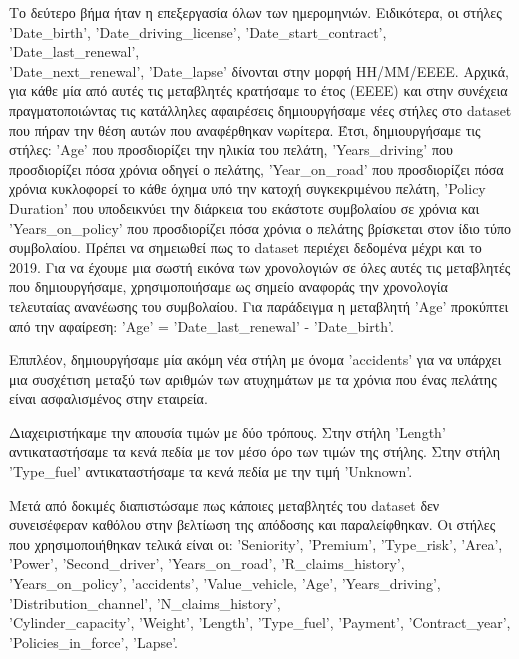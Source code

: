 \documentclass{llncs}
\begin{document}
Το δεύτερο βήμα ήταν η επεξεργασία όλων των ημερομηνιών. Ειδικότερα, οι στήλες 'Date\_birth', 'Date\_driving\_license', 'Date\_start\_contract', 'Date\_last\_renewal', \\
'Date\_next\_renewal', 'Date\_lapse' δίνονται στην μορφή ΗΗ/ΜΜ/ΕΕΕΕ. Αρχικά, για κάθε μία από αυτές τις μεταβλητές κρατήσαμε το έτος (ΕΕΕΕ) και στην συνέχεια πραγματοποιώντας τις κατάλληλες αφαιρέσεις
δημιουργήσαμε νέες στήλες στο dataset που πήραν την θέση αυτών που αναφέρθηκαν νωρίτερα. Έτσι, δημιουργήσαμε τις στήλες: 'Age' που προσδιορίζει την ηλικία του πελάτη, 'Years\_driving' που προσδιορίζει 
πόσα χρόνια οδηγεί ο πελάτης, 'Year\_on\_road' που προσδιορίζει πόσα χρόνια κυκλοφορεί το κάθε όχημα υπό την κατοχή συγκεκριμένου πελάτη, 'Policy Duration' που υποδεικνύει την διάρκεια του εκάστοτε συμβολαίου σε χρόνια και 
'Years\_on\_policy' που προσδιορίζει πόσα χρόνια ο πελάτης βρίσκεται στον ίδιο τύπο συμβολαίου. Πρέπει να σημειωθεί πως το dataset περιέχει δεδομένα μέχρι και το 2019. Για να έχουμε μια σωστή εικόνα των χρονολογιών
σε όλες αυτές τις μεταβλητές που δημιουργήσαμε, χρησιμοποιήσαμε ως σημείο αναφοράς την χρονολογία τελευταίας ανανέωσης του συμβολαίου. Για παράδειγμα η μεταβλητή 'Age' προκύπτει από την αφαίρεση:
'Age' = 'Date\_last\_renewal' - 'Date\_birth'.

Επιπλέον, δημιουργήσαμε μία ακόμη νέα στήλη με όνομα 'accidents' για να υπάρχει μια συσχέτιση μεταξύ των αριθμών των ατυχημάτων με τα χρόνια που ένας πελάτης είναι ασφαλισμένος στην εταιρεία.

Διαχειριστήκαμε την απουσία τιμών με δύο τρόπους. Στην στήλη 'Length' αντικαταστήσαμε τα κενά πεδία με τον μέσο όρο των τιμών της στήλης. Στην στήλη 'Type\_fuel' αντικαταστήσαμε τα κενά πεδία με την τιμή 
'Unknown'.

Μετά από δοκιμές διαπιστώσαμε πως κάποιες μεταβλητές του dataset δεν συνεισέφεραν καθόλου στην βελτίωση της απόδοσης και παραλείφθηκαν. Οι στήλες που χρησιμοποιήθηκαν τελικά είναι οι: 
'Seniority', 'Premium', 'Type\_risk', 'Area', 'Power', 'Second\_driver', 'Years\_on\_road', 'R\_claims\_history', 'Years\_on\_policy', 'accidents', 'Value\_vehicle, 'Age', 'Years\_driving', 'Distribution\_channel', 'N\_claims\_history',
\\ 'Cylinder\_capacity', 'Weight', 'Length', 'Type\_fuel', 'Payment', 'Contract\_year', \\'Policies\_in\_force', 'Lapse'.
\end{document}
